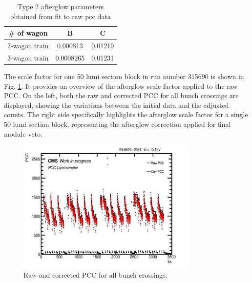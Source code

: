 \newpage
\begin{table}
  \centering
  \caption[Type 2 afterglow parameters estimation]{Type 2 afterglow parameters obtained from fit to raw pcc data}
  \begin{tabular}{ccc}
    \textbf{\# of wagon} & \textbf{B} & \textbf{C} \\
     \hline
   2-wagon train  & 0.000813 &  0.01219\\
   3-wagon train  & 0.0008265 &  0.01231\\
  \end{tabular}
  \label{fig:af_fit4000}
\end{table}

The scale factor for one 50 lumi section block in run number 315690 is shown in Fig. \ref{fig:af_change_veto}. It provides an overview of the afterglow scale factor applied to the raw PCC. On the left, both the raw and corrected PCC for all bunch crossings are displayed, showing the variations between the initial data and the adjusted counts. The right side specifically highlights the afterglow scale factor for a single 50 lumi section block, representing the afterglow correction applied for final module veto.

\newpage
\begin{figure}[H]
\centering
\includegraphics[width=0.8\textwidth]{ashish_thesis/afterglow_correction_factor_1lsblock_315690_2.png}
\caption[Run 315690 PCC without and with afterglow correction]{%
 Raw and corrected PCC for all bunch crossings.
}
\label{fig:af_change_veto}
\end{figure}

